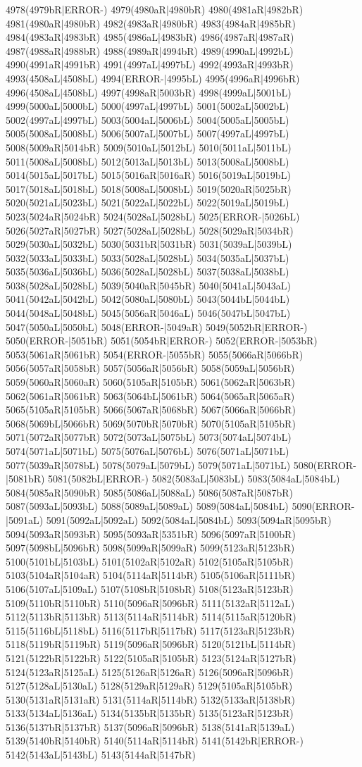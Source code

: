 4978(4979bR|ERROR-) 4979(4980aR|4980bR) 4980(4981aR|4982bR) 4981(4980aR|4980bR) 4982(4983aR|4980bR) 4983(4984aR|4985bR) 4984(4983aR|4983bR) 4985(4986aL|4983bR) 4986(4987aR|4987aR) 4987(4988aR|4988bR) 4988(4989aR|4994bR) 4989(4990aL|4992bL) 4990(4991aR|4991bR) 4991(4997aL|4997bL) 4992(4993aR|4993bR) 4993(4508aL|4508bL) 4994(ERROR-|4995bL) 4995(4996aR|4996bR) 4996(4508aL|4508bL) 4997(4998aR|5003bR) 4998(4999aL|5001bL) 4999(5000aL|5000bL) 5000(4997aL|4997bL) 5001(5002aL|5002bL) 5002(4997aL|4997bL) 5003(5004aL|5006bL) 5004(5005aL|5005bL) 5005(5008aL|5008bL) 5006(5007aL|5007bL) 5007(4997aL|4997bL) 5008(5009aR|5014bR) 5009(5010aL|5012bL) 5010(5011aL|5011bL) 5011(5008aL|5008bL) 5012(5013aL|5013bL) 5013(5008aL|5008bL) 5014(5015aL|5017bL) 5015(5016aR|5016aR) 5016(5019aL|5019bL) 5017(5018aL|5018bL) 5018(5008aL|5008bL) 5019(5020aR|5025bR) 5020(5021aL|5023bL) 5021(5022aL|5022bL) 5022(5019aL|5019bL) 5023(5024aR|5024bR) 5024(5028aL|5028bL) 5025(ERROR-|5026bL) 5026(5027aR|5027bR) 5027(5028aL|5028bL) 5028(5029aR|5034bR) 5029(5030aL|5032bL) 5030(5031bR|5031bR) 5031(5039aL|5039bL) 5032(5033aL|5033bL) 5033(5028aL|5028bL) 5034(5035aL|5037bL) 5035(5036aL|5036bL) 5036(5028aL|5028bL) 5037(5038aL|5038bL) 5038(5028aL|5028bL) 5039(5040aR|5045bR) 5040(5041aL|5043aL) 5041(5042aL|5042bL) 5042(5080aL|5080bL) 5043(5044bL|5044bL) 5044(5048aL|5048bL) 5045(5056aR|5046aL) 5046(5047bL|5047bL) 5047(5050aL|5050bL) 5048(ERROR-|5049aR) 5049(5052bR|ERROR-) 5050(ERROR-|5051bR) 5051(5054bR|ERROR-) 5052(ERROR-|5053bR) 5053(5061aR|5061bR) 5054(ERROR-|5055bR) 5055(5066aR|5066bR) 5056(5057aR|5058bR) 5057(5056aR|5056bR) 5058(5059aL|5056bR) 5059(5060aR|5060aR) 5060(5105aR|5105bR) 5061(5062aR|5063bR) 5062(5061aR|5061bR) 5063(5064bL|5061bR) 5064(5065aR|5065aR) 5065(5105aR|5105bR) 5066(5067aR|5068bR) 5067(5066aR|5066bR) 5068(5069bL|5066bR) 5069(5070bR|5070bR) 5070(5105aR|5105bR) 5071(5072aR|5077bR) 5072(5073aL|5075bL) 5073(5074aL|5074bL) 5074(5071aL|5071bL) 5075(5076aL|5076bL) 5076(5071aL|5071bL) 5077(5039aR|5078bL) 5078(5079aL|5079bL) 5079(5071aL|5071bL) 5080(ERROR-|5081bR) 5081(5082bL|ERROR-) 5082(5083aL|5083bL) 5083(5084aL|5084bL) 5084(5085aR|5090bR) 5085(5086aL|5088aL) 5086(5087aR|5087bR) 5087(5093aL|5093bL) 5088(5089aL|5089aL) 5089(5084aL|5084bL) 5090(ERROR-|5091aL) 5091(5092aL|5092aL) 5092(5084aL|5084bL) 5093(5094aR|5095bR) 5094(5093aR|5093bR) 5095(5093aR|5351bR) 5096(5097aR|5100bR) 5097(5098bL|5096bR) 5098(5099aR|5099aR) 5099(5123aR|5123bR) 5100(5101bL|5103bL) 5101(5102aR|5102aR) 5102(5105aR|5105bR) 5103(5104aR|5104aR) 5104(5114aR|5114bR) 5105(5106aR|5111bR) 5106(5107aL|5109aL) 5107(5108bR|5108bR) 5108(5123aR|5123bR) 5109(5110bR|5110bR) 5110(5096aR|5096bR) 5111(5132aR|5112aL) 5112(5113bR|5113bR) 5113(5114aR|5114bR) 5114(5115aR|5120bR) 5115(5116bL|5118bL) 5116(5117bR|5117bR) 5117(5123aR|5123bR) 5118(5119bR|5119bR) 5119(5096aR|5096bR) 5120(5121bL|5114bR) 5121(5122bR|5122bR) 5122(5105aR|5105bR) 5123(5124aR|5127bR) 5124(5123aR|5125aL) 5125(5126aR|5126aR) 5126(5096aR|5096bR) 5127(5128aL|5130aL) 5128(5129aR|5129aR) 5129(5105aR|5105bR) 5130(5131aR|5131aR) 5131(5114aR|5114bR) 5132(5133aR|5138bR) 5133(5134aL|5136aL) 5134(5135bR|5135bR) 5135(5123aR|5123bR) 5136(5137bR|5137bR) 5137(5096aR|5096bR) 5138(5141aR|5139aL) 5139(5140bR|5140bR) 5140(5114aR|5114bR) 5141(5142bR|ERROR-) 5142(5143aL|5143bL) 5143(5144aR|5147bR) 